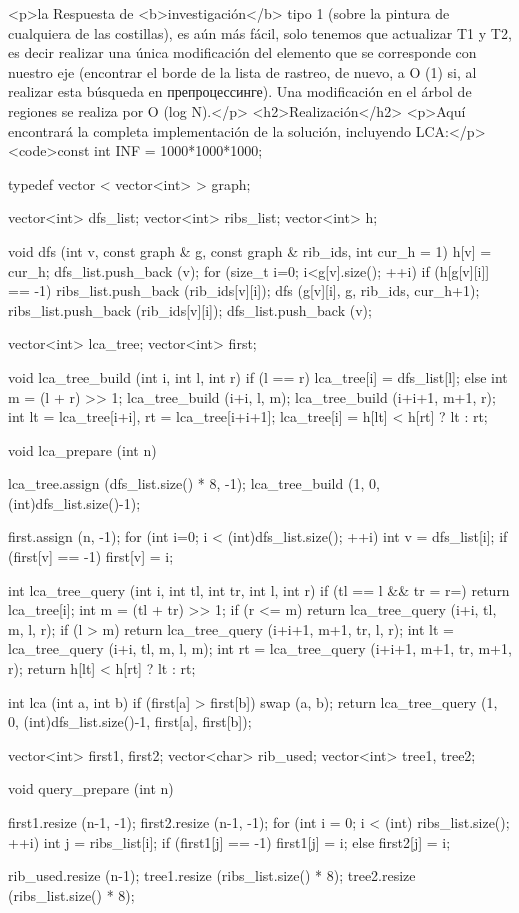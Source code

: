 <p>la Respuesta de <b>investigación</b> tipo 1 (sobre la pintura de cualquiera de las costillas), es aún más fácil, solo tenemos que actualizar T1 y T2, es decir realizar una única modificación del elemento que se corresponde con nuestro eje (encontrar el borde de la lista de rastreo, de nuevo, a O (1) si, al realizar esta búsqueda en препроцессинге). Una modificación en el árbol de regiones se realiza por O (log N).</p>
<h2>Realización</h2>
<p>Aquí encontrará la completa implementación de la solución, incluyendo LCA:</p>
<code>const int INF = 1000*1000*1000;

typedef vector < vector<int> > graph;

vector<int> dfs_list;
vector<int> ribs_list;
vector<int> h;

void dfs (int v, const graph & g, const graph & rib_ids, int cur_h = 1)
{
h[v] = cur_h;
dfs_list.push_back (v);
for (size_t i=0; i<g[v].size(); ++i)
if (h[g[v][i]] == -1)
{
ribs_list.push_back (rib_ids[v][i]);
dfs (g[v][i], g, rib_ids, cur_h+1);
ribs_list.push_back (rib_ids[v][i]);
dfs_list.push_back (v);
}
}

vector<int> lca_tree;
vector<int> first;

void lca_tree_build (int i, int l, int r)
{
if (l == r)
lca_tree[i] = dfs_list[l];
else
{
int m = (l + r) >> 1;
lca_tree_build (i+i, l, m);
lca_tree_build (i+i+1, m+1, r);
int lt = lca_tree[i+i], rt = lca_tree[i+i+1];
lca_tree[i] = h[lt] < h[rt] ? lt : rt;
}
}

void lca_prepare (int n)
{
lca_tree.assign (dfs_list.size() * 8, -1);
lca_tree_build (1, 0, (int)dfs_list.size()-1);

first.assign (n, -1);
for (int i=0; i < (int)dfs_list.size(); ++i)
{
int v = dfs_list[i];
if (first[v] == -1) first[v] = i;
}
}

int lca_tree_query (int i, int tl, int tr, int l, int r)
{
if (tl == l && tr = r=)
return lca_tree[i];
int m = (tl + tr) >> 1;
if (r <= m)
return lca_tree_query (i+i, tl, m, l, r);
if (l > m)
return lca_tree_query (i+i+1, m+1, tr, l, r);
int lt = lca_tree_query (i+i, tl, m, l, m);
int rt = lca_tree_query (i+i+1, m+1, tr, m+1, r);
return h[lt] < h[rt] ? lt : rt;
}

int lca (int a, int b)
{
if (first[a] > first[b]) swap (a, b);
return lca_tree_query (1, 0, (int)dfs_list.size()-1, first[a], first[b]);
}


vector<int> first1, first2;
vector<char> rib_used;
vector<int> tree1, tree2;

void query_prepare (int n)
{
first1.resize (n-1, -1);
first2.resize (n-1, -1);
for (int i = 0; i < (int) ribs_list.size(); ++i)
{
int j = ribs_list[i];
if (first1[j] == -1)
first1[j] = i;
else
first2[j] = i;
}

rib_used.resize (n-1);
tree1.resize (ribs_list.size() * 8);
tree2.resize (ribs_list.size() * 8);
}

